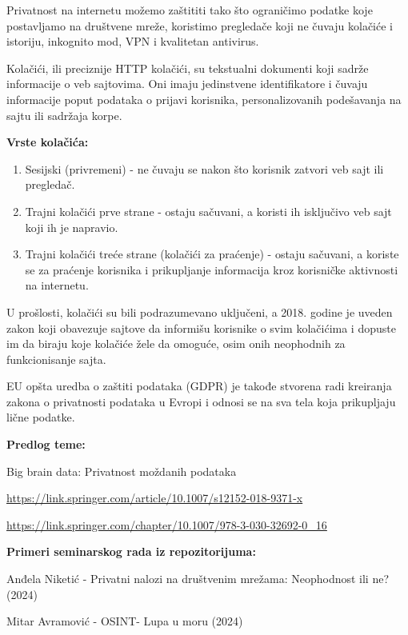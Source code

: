 \documentclass{article}
\begin{document}
Privatnost na internetu možemo zaštititi tako što ograničimo podatke koje postavljamo na društvene mreže, koristimo pregledače koji ne čuvaju kolačiće i istoriju, inkognito mod, VPN i kvalitetan antivirus. 

Kolačići, ili preciznije HTTP kolačići, su tekstualni dokumenti koji sadrže informacije o veb sajtovima. Oni imaju jedinstvene identifikatore i čuvaju informacije poput podataka o prijavi korisnika, personalizovanih podešavanja na sajtu ili sadržaja korpe. 

\textbf{Vrste kolačića:}

\begin{enumerate}[label=\arabic*.]
    \item Sesijski (privremeni) - ne čuvaju se nakon što korisnik zatvori veb sajt ili pregledač.
    \item Trajni kolačići prve strane - ostaju sačuvani, a koristi ih isključivo veb sajt koji ih je napravio.
    \item Trajni kolačići treće strane (kolačići za praćenje) - ostaju sačuvani, a koriste se za praćenje korisnika i prikupljanje informacija kroz korisničke aktivnosti na internetu.
\end{enumerate}

U prošlosti, kolačići su bili podrazumevano uključeni, a 2018. godine je uveden zakon koji obavezuje sajtove da informišu korisnike o svim kolačićima i dopuste im da biraju koje kolačiće žele da omoguće, osim onih neophodnih za funkcionisanje sajta. 

EU opšta uredba o zaštiti podataka (GDPR) je takođe stvorena radi kreiranja zakona o privatnosti podataka u Evropi i odnosi se na sva tela koja prikupljaju lične podatke.

\textbf{Predlog teme:}

Big brain data: Privatnost moždanih podataka

\url{https://link.springer.com/article/10.1007/s12152-018-9371-x}

\url{https://link.springer.com/chapter/10.1007/978-3-030-32692-0_16}

\textbf{Primeri seminarskog rada iz repozitorijuma:}

Anđela Niketić - Privatni nalozi na društvenim mrežama: Neophodnost ili ne? (2024)

Mitar Avramović - OSINT- Lupa u moru (2024)
\end{document}
